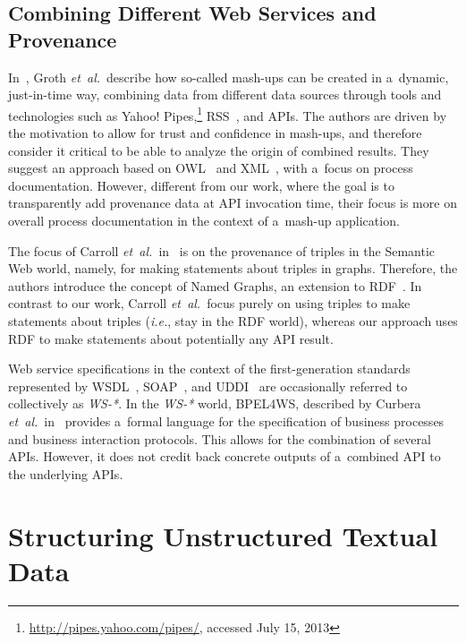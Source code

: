 \subsection{Combining Different Web Services and Provenance}

In~\cite{groth2009mashups}, Groth \emph{et~al.}\ describe
how so-called mash-ups can be created in a~dynamic,
just-in-time way, combining data from different data sources
through tools and technologies such as
Yahoo! Pipes,\footnote{\url{http://pipes.yahoo.com/pipes/},
accessed July 15, 2013}
RSS~\cite{cadenhead2006rss}, and APIs.
The authors are driven by the motivation to allow for trust
and confidence in mash-ups, and therefore
consider it critical to be able to analyze the origin
of combined results.
They suggest an approach based on OWL~\cite{mcguinness2004owl}
and XML~\cite{bray2008xml},
with a~focus on process documentation.
However, different from our work, where the goal is to transparently
add provenance data at API invocation time,
their focus is more on overall process documentation
in the context of a~mash-up application.

The focus of Carroll \emph{et~al.}\ in~\cite{carroll2005namedgraphs}
is on the provenance of triples in the Semantic Web world, namely,
for making statements about triples in graphs.
Therefore, the authors introduce the concept of Named Graphs,
an extension to RDF~\cite{klyne2004rdf}.
In contrast to our work, Carroll \emph{et~al.}\ focus
purely on using triples to make statements about triples
(\emph{i.e.}, stay in the RDF world),
whereas our approach uses RDF to make statements
about potentially any API result.

Web service specifications in the context of the
first-generation standards represented by WSDL~\cite{christensen2001wsdl},
SOAP~\cite{gudgin2007soap}, and UDDI~\cite{sabbouh2001uddi}
are occasionally referred to collectively as \emph{WS-*}.
In the \emph{WS-*} world, BPEL4WS, described by
Curbera \emph{et~al.}\ in~\cite{curbera2003bpel4ws}
provides a~formal language for the specification of
business processes and business interaction protocols.
This allows for the combination of several APIs.
However, it does not credit back concrete outputs of a~combined API
to the underlying APIs.

\section{Structuring Unstructured Textual Data}
\label{sec:structuring}

